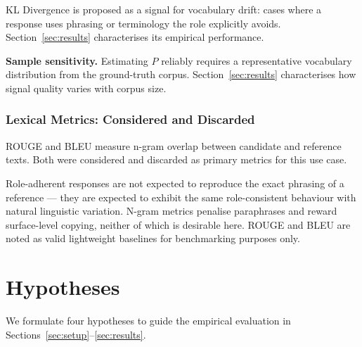\documentclass[11pt,a4paper]{article}
\begin{document}
KL Divergence is proposed as a signal for vocabulary drift: cases where a
response uses phrasing or terminology the role explicitly avoids.
Section~\ref{sec:results} characterises its empirical performance.

\textbf{Sample sensitivity.} Estimating $P$ reliably requires a
representative vocabulary distribution from the ground-truth corpus.
Section~\ref{sec:results} characterises how signal quality varies with
corpus size.

\subsubsection{Lexical Metrics: Considered and Discarded}

ROUGE \citep{lin2004rouge} and BLEU \citep{papineni2002bleu} measure n-gram
overlap between candidate and reference texts. Both were considered and
discarded as primary metrics for this use case.

Role-adherent responses are not expected to reproduce the exact phrasing of a
reference --- they are expected to exhibit the same role-consistent behaviour
with natural linguistic variation. N-gram metrics penalise paraphrases and
reward surface-level copying, neither of which is desirable here. ROUGE and
BLEU are noted as valid lightweight baselines for benchmarking purposes only.

\section{Hypotheses}
\label{sec:hypotheses}

We formulate four hypotheses to guide the empirical evaluation in
Sections~\ref{sec:setup}--\ref{sec:results}.
\end{document}
